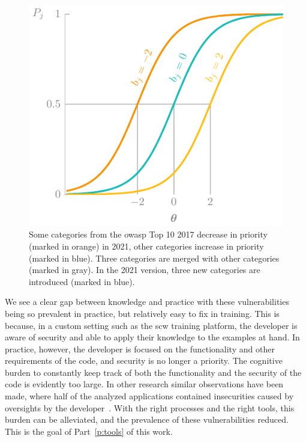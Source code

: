 \begin{figure}
    \centering
    \includegraphics[page=23, width=\textwidth]{03-education/figures/tikzfigures.pdf}
  \caption[OWASP Top 10 2021]{Some categories from the \gls{owasp} Top 10 2017 decrease in priority (marked in orange) in 2021, other categories increase in priority (marked in blue). Three categories are merged with other categories (marked in gray). In the 2021 version, three new categories are introduced (marked in blue).}
  \label{fig:newowasptop10} 
\end{figure}


We see a clear gap between knowledge and practice with these vulnerabilities being so prevalent in practice, but relatively easy to fix in training.
This is because, in a custom setting such as the \gls{scw} training platform, the developer is aware of security and able to apply their knowledge to the examples at hand.
In practice, however, the developer is focused on the functionality and other requirements of the code, and security is no longer a priority.
The cognitive burden to constantly keep track of both the functionality and the security of the code is evidently too large.
In other research similar observations have been made, where half of the analyzed applications contained insecurities caused by oversights by the developer~\cite{votipka2020understanding}.
With the right processes and the right tools, this burden can be alleviated, and the prevalence of these vulnerabilities reduced.
This is the goal of Part~\ref{p:tools} of this work.

